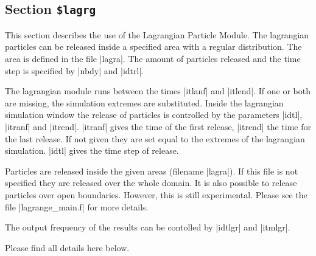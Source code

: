 \subsection{Section {\tt \$lagrg}}


This section describes the use of the Lagrangian Particle Module.
The lagrangian particles can be released inside a specified area with a
regular distribution. The area is defined in the file |lagra|.
The amount of particles released and the
time step is specified by |nbdy| and |idtrl|.

The lagrangian module runs between the times |itlanf| and |itlend|. If one
or both are missing, the simulation extremes are substituted. Inside
the lagrangian simulation window the release of particles is controlled
by the parameters |idtl|, |itranf| and |itrend|. |itranf| gives the time
of the first release, |itrend| the time for the last release. If not
given they are set equal to the extremes of the lagrangian simulation.
|idtl| gives the time step of release.

Particles are released inside the given areas (filename |lagra|). If
this file is not specified they are released over the whole domain. It is also possible to
 release particles over open boundaries. However,
this is still experimental. Please see the file |lagrange_main.f|
for more details.

The output frequency of the results can be contolled by 
|idtlgr| and |itmlgr|.

Please find all details here below.

\par

\par

\par

